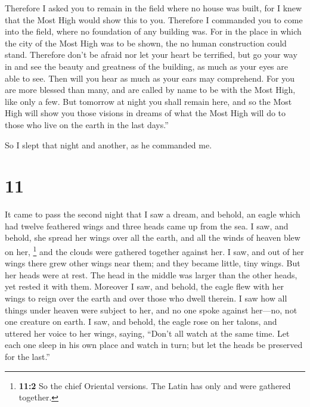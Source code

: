  Therefore I asked you to remain in the field where no
house was built,  for I knew that the Most High would
show this to you.  Therefore I commanded you to come into
the field, where no foundation of any building was.  For
in the place in which the city of the Most High was to be shown, the no
human construction could stand.  Therefore don't be
afraid nor let your heart be terrified, but go your way in and see the
beauty and greatness of the building, as much as your eyes are able to
see.  Then will you hear as much as your ears may
comprehend.  For you are more blessed than many, and are
called by name to be with the Most High, like only a few.
 But tomorrow at night you shall remain here,
 and so the Most High will show you those visions in
dreams of what the Most High will do to those who live on the earth in
the last days.''

So I slept that night and another, as he commanded me.

\hypertarget{section-10}{%
\section{11}\label{section-10}}

 It came to pass the second night that I saw a dream, and
behold, an eagle which had twelve feathered wings and three heads came
up from the sea.  I saw, and behold, she spread her wings
over all the earth, and all the winds of heaven blew on her, \footnote{\textbf{11:2}
  So the chief Oriental versions. The Latin has only and were gathered
  together.} and the clouds were gathered together against her.
 I saw, and out of her wings there grew other wings near
them; and they became little, tiny wings.  But her heads
were at rest. The head in the middle was larger than the other heads,
yet rested it with them.  Moreover I saw, and behold, the
eagle flew with her wings to reign over the earth and over those who
dwell therein.  I saw how all things under heaven were
subject to her, and no one spoke against her---no, not one creature on
earth.  I saw, and behold, the eagle rose on her talons,
and uttered her voice to her wings, saying,  ``Don't all
watch at the same time. Let each one sleep in his own place and watch in
turn;  but let the heads be preserved for the last.''

